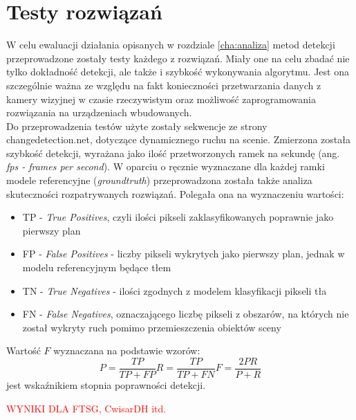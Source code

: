 \chapter{Testy rozwiązań}
\label{cha:testy}

W celu ewaluacji działania opisanych w rozdziale \ref{cha:analiza} metod detekcji przeprowadzone zostały testy każdego z rozwiązań. Miały one na celu zbadać nie tylko dokładność detekcji, ale także i szybkość wykonywania algorytmu. Jest ona szczególnie ważna ze względu na fakt konieczności przetwarzania danych z kamery wizyjnej w czasie rzeczywistym oraz możliwość zaprogramowania rozwiązania na urządzeniach wbudowanych. \\
Do przeprowadzenia testów użyte zostały sekwencje ze strony changedetection.net, dotyczące dynamicznego ruchu na scenie. Zmierzona została szybkość detekcji, wyrażana jako ilość przetworzonych ramek na sekundę (ang. \textit{fps - frames per second}). W oparciu o ręcznie wyznaczane dla każdej ramki modele referencyjne (\textit{groundtruth}) przeprowadzona została także analiza skuteczności rozpatrywanych rozwiązań. Polegała ona na wyznaczeniu wartości:
\begin{itemize}
\item TP - \textit{True Positives}, czyli ilości pikseli zaklasyfikowanych poprawnie jako pierwszy plan
\item FP - \textit{False Positives} - liczby pikseli wykrytych jako pierwszy plan, jednak w modelu referencyjnym będące tłem
\item TN - \textit{True Negatives} - ilości zgodnych z modelem klasyfikacji pikseli tła
\item FN - \textit{False Negatives}, oznaczającego liczbę pikseli z obszarów, na których nie został wykryty ruch pomimo przemieszczenia obiektów sceny
\end{itemize}
Wartość $F$ wyznaczana na podstawie wzorów:
\begin{equation}
P = \frac{TP}{TP+FP}
R = \frac{TP}{TP+FN}
F = \frac{2PR}{P+R}
\end{equation}
jest wskaźnikiem stopnia poprawności detekcji.
\\
\begin{LARGE}
\textcolor{red}{WYNIKI DLA FTSG, CwisarDH itd.}
\end{LARGE}

